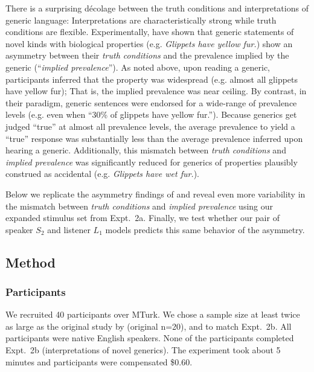 \documentclass[12pt,letterpaper]{article}
\begin{document}
There is a surprising d\'{e}colage between the truth conditions and interpretations of generic language: Interpretations are characteristically strong while truth conditions are flexible. 
Experimentally,  have shown that generic statements of novel kinds with biological properties (e.g. \emph{Glippets have yellow fur.}) show an asymmetry between their \emph{truth conditions} and the prevalence implied by the generic (``\emph{implied prevalence}''). 
As noted above, upon reading a generic, participants inferred that the property was widespread (e.g. almost all glippets have yellow fur); That is, the implied prevalence was near ceiling.
By contrast, in their paradigm, generic sentences were endorsed for a wide-range of prevalence levels (e.g. even when ``30\% of glippets have yellow fur.''). 
Because generics get judged ``true'' at almost all prevalence levels, the average prevalence to yield a ``true'' response was substantially less than the average prevalence inferred upon hearing a generic. 
Additionally, this mismatch between \emph{truth conditions} and \emph{implied prevalence} was significantly reduced for generics of properties plausibly construed as accidental (e.g. \emph{Glippets have wet fur.}).

Below we replicate the asymmetry findings of  and reveal even more variability in the mismatch between \emph{truth conditions} and \emph{implied prevalence} using our expanded stimulus set from Expt.~2a.
Finally, we test whether our pair of speaker $S_2$ and listener $L_1$ models predicts this same behavior of the asymmetry.


\subsection*{Method}
\subsubsection*{Participants}

We recruited 40 participants over MTurk.  
We chose a sample size at least twice as large as the original study by  (original n=20), and to match Expt.~2b. 
All participants were native English speakers. 
None of the participants completed Expt.~2b (interpretations of novel generics).
The experiment took about 5 minutes and participants were compensated \$0.60.
\end{document}
